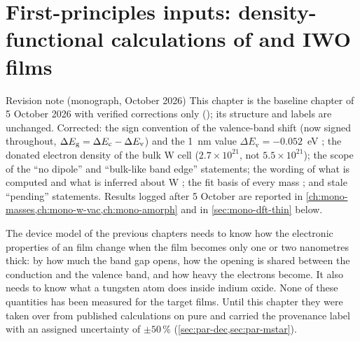 \newenvironment{dftplain}{\par\medskip\noindent\textit{In plain words.}\ }{\par\medskip}

\chapter{First-principles inputs: density-functional calculations of \texorpdfstring{\InO}{In2O3} and IWO films}
\label{ch:dft}

\begin{statusbox}{Revision note (monograph, October 2026)}
This chapter is the baseline chapter of 5 October 2026 with verified corrections only
(); its structure and labels are unchanged. Corrected:
the sign convention of the valence-band shift (now signed throughout, $\Delta E_{\mathrm{g}} = \Delta E_{\mathrm{c}} - \Delta E_{\mathrm{v}}$) and
the 1~nm value $\Delta E_{\mathrm{v}} = -0.052$~eV ; the donated electron density of the bulk W cell
($2.7\times10^{21}$\cmcu{}, not $5.5\times10^{21}$); the scope of the ``no dipole'' and ``bulk-like band edge''
statements; the wording of what is computed and what is inferred about W ; the fit basis of every mass
; and stale ``pending'' statements. Results logged after 5 October are reported in
\cref{ch:mono-masses,ch:mono-w-vac,ch:mono-amorph} and in \cref{sec:mono-dft-thin} below.
\end{statusbox}

The device model of the previous chapters needs to know how the electronic properties of an \IWO{} film change when
the film becomes only one or two nanometres thick: by how much the band gap opens, how the opening is shared between
the conduction and the valence band, and how heavy the electrons become. It also needs to know what a tungsten atom
does inside indium oxide. None of these quantities has been measured for the target films. Until this chapter they
were taken over from published calculations on pure \InO{} and carried the provenance label
 with an assigned uncertainty of $\pm50$\,\% (\cref{sec:par-dec,sec:par-mstar}).

